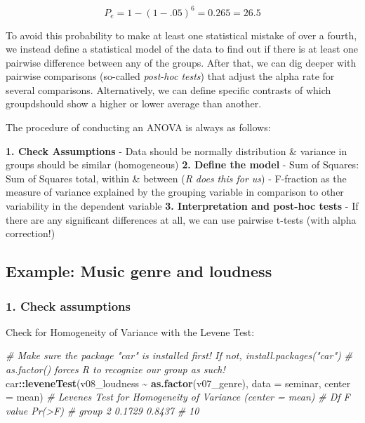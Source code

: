\documentclass[
]{book}
\newenvironment{Shaded}{\begin{snugshade}}{\end{snugshade}}
\newcommand{\AttributeTok}[1]{\textcolor[rgb]{0.13,0.29,0.53}{#1}}
\newcommand{\CommentTok}[1]{\textcolor[rgb]{0.56,0.35,0.01}{\textit{#1}}}
\newcommand{\FunctionTok}[1]{\textcolor[rgb]{0.13,0.29,0.53}{\textbf{#1}}}
\newcommand{\NormalTok}[1]{#1}
\newcommand{\SpecialCharTok}[1]{\textcolor[rgb]{0.81,0.36,0.00}{\textbf{#1}}}
\begin{document}
\[P_e = 1 - (1-.05)^6 = 0.265 = 26.5%
\]

To avoid this probability to make at least one statistical mistake of over a fourth, we instead define a statistical model of the data to find out if there is at least one pairwise difference between any of the groups.
After that, we can dig deeper with pairwise comparisons (so-called \emph{post-hoc tests}) that adjust the alpha rate for several comparisons.
Alternatively, we can define specific contrasts of which groupdshould show a higher or lower average than another.

The procedure of conducting an ANOVA is always as follows:

\textbf{1. Check Assumptions}
- Data should be normally distribution \& variance in groups should be similar (homogeneous)
\textbf{2. Define the model }
- Sum of Squares: Sum of Squares total, within \& between (\emph{R does this for us})
- F-fraction as the measure of variance explained by the grouping variable in comparison to other variability in the dependent variable
\textbf{3. Interpretation and post-hoc tests}
- If there are any significant differences at all, we can use pairwise t-tests (with alpha correction!)

\subsection*{\texorpdfstring{Example: Music genre and loudness }{Example: Music genre and loudness }}\label{example-music-genre-and-loudness}

\subsubsection*{1. Check assumptions}\label{check-assumptions}

Check for Homogeneity of Variance with the Levene Test:

\begin{Shaded}
\begin{Highlighting}[]
\CommentTok{\# Make sure the package "car" is installed first! If not, install.packages("car")}
\CommentTok{\# as.factor() forces R to recognize our group as such!}
\NormalTok{car}\SpecialCharTok{::}\FunctionTok{leveneTest}\NormalTok{(v08\_loudness }\SpecialCharTok{\textasciitilde{}} \FunctionTok{as.factor}\NormalTok{(v07\_genre), }\AttributeTok{data =}\NormalTok{ seminar, }\AttributeTok{center =}\NormalTok{ mean)}
\CommentTok{\# Levene\textquotesingle{}s Test for Homogeneity of Variance (center = mean)}
\CommentTok{\#       Df F value Pr(\textgreater{}F)}
\CommentTok{\# group  2  0.1729 0.8437}
\CommentTok{\#       10}
\end{Highlighting}
\end{Shaded}
\end{document}
